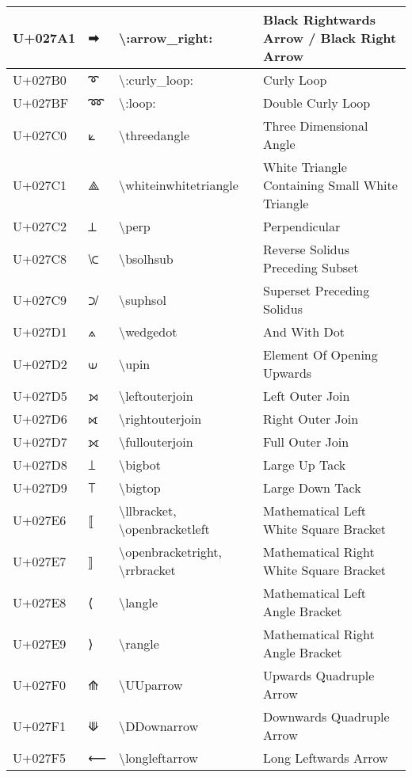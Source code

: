 \begin{table}[h]
\begin{tabulary}{\linewidth}{|L|L|L|L|}
\hline
U+027A1 & ➡ & {\textbackslash}:arrow\_right: & Black Rightwards Arrow / Black Right Arrow \\
\hline
U+027B0 & ➰ & {\textbackslash}:curly\_loop: & Curly Loop \\
\hline
U+027BF & ➿ & {\textbackslash}:loop: & Double Curly Loop \\
\hline
U+027C0 & ⟀ & {\textbackslash}threedangle & Three Dimensional Angle \\
\hline
U+027C1 & ⟁ & {\textbackslash}whiteinwhitetriangle & White Triangle Containing Small White Triangle \\
\hline
U+027C2 & ⟂ & {\textbackslash}perp & Perpendicular \\
\hline
U+027C8 & ⟈ & {\textbackslash}bsolhsub & Reverse Solidus Preceding Subset \\
\hline
U+027C9 & ⟉ & {\textbackslash}suphsol & Superset Preceding Solidus \\
\hline
U+027D1 & ⟑ & {\textbackslash}wedgedot & And With Dot \\
\hline
U+027D2 & ⟒ & {\textbackslash}upin & Element Of Opening Upwards \\
\hline
U+027D5 & ⟕ & {\textbackslash}leftouterjoin & Left Outer Join \\
\hline
U+027D6 & ⟖ & {\textbackslash}rightouterjoin & Right Outer Join \\
\hline
U+027D7 & ⟗ & {\textbackslash}fullouterjoin & Full Outer Join \\
\hline
U+027D8 & ⟘ & {\textbackslash}bigbot & Large Up Tack \\
\hline
U+027D9 & ⟙ & {\textbackslash}bigtop & Large Down Tack \\
\hline
U+027E6 & ⟦ & {\textbackslash}llbracket, {\textbackslash}openbracketleft & Mathematical Left White Square Bracket \\
\hline
U+027E7 & ⟧ & {\textbackslash}openbracketright, {\textbackslash}rrbracket & Mathematical Right White Square Bracket \\
\hline
U+027E8 & ⟨ & {\textbackslash}langle & Mathematical Left Angle Bracket \\
\hline
U+027E9 & ⟩ & {\textbackslash}rangle & Mathematical Right Angle Bracket \\
\hline
U+027F0 & ⟰ & {\textbackslash}UUparrow & Upwards Quadruple Arrow \\
\hline
U+027F1 & ⟱ & {\textbackslash}DDownarrow & Downwards Quadruple Arrow \\
\hline
U+027F5 & ⟵ & {\textbackslash}longleftarrow & Long Leftwards Arrow \\

\end{tabulary}
\end{table}
